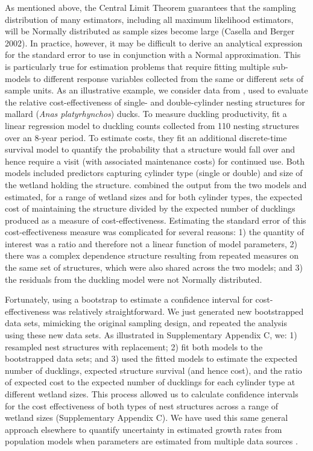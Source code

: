 \documentclass[fleqn,10pt]{wlpeerj} %
\begin{document}
As mentioned above, the Central Limit Theorem guarantees that the sampling distribution of many estimators, including all maximum likelihood estimators, will be Normally distributed as sample sizes become large (Casella and Berger 2002). In practice, however, it may be difficult to derive an analytical expression for the standard error to use in conjunction with a Normal approximation. This is particularly true for estimation problems that require fitting multiple sub-models to different response variables collected from the same or different sets of sample units. As an illustrative example, we consider data from \citet{ZICUS2006}, used to evaluate the relative cost-effectiveness of single- and double-cylinder nesting structures for mallard (\emph{Anas platyrhynchos}) ducks. To measure duckling productivity, \citet{ZICUS2006} fit a linear regression model to duckling counts collected from 110 nesting structures over an 8-year period. To estimate costs, they fit an additional discrete-time survival model to quantify the probability that a structure would fall over and hence require a visit (with associated maintenance costs) for continued use. Both models included predictors capturing cylinder type (single or double) and size of the wetland holding the structure. \citet{ZICUS2006} combined the output from the two models and estimated, for a range of wetland sizes and for both cylinder types, the expected cost of maintaining the structure divided by the expected number of ducklings produced as a measure of cost-effectiveness. Estimating the standard error of this cost-effectiveness measure was complicated for several reasons: 1) the quantity of interest was a ratio and therefore not a linear function of model parameters, 2) there was a complex dependence structure resulting from repeated measures on the same set of structures, which were also shared across the two models; and 3) the residuals from the duckling model were not Normally distributed.

Fortunately, using a bootstrap to estimate a confidence interval for cost-effectiveness was relatively straightforward. We just generated new bootstrapped data sets, mimicking the original sampling design, and repeated the analysis using these new data sets. As illustrated in Supplementary Appendix C, we: 1) resampled nest structures with replacement; 2) fit both models to the bootstrapped data sets; and 3) used the fitted models to estimate the expected number of ducklings, expected structure survival (and hence cost), and the ratio of expected cost to the expected number of ducklings for each cylinder type at different wetland sizes. This process allowed us to calculate confidence intervals for the cost effectiveness of both types of nest structures across a range of wetland sizes (Supplementary Appendix C). We have used this same general approach elsewhere to quantify uncertainty in estimated growth rates from population models when parameters are estimated from multiple data sources \citep[e.g.,][]{Ellner2003, Fieberg2010, Lenarz2010}.
\end{document}
